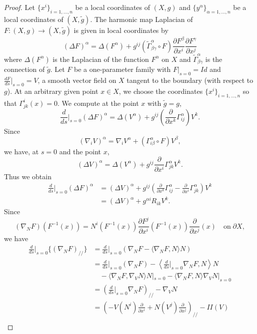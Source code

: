 \begin{proof}
Let $\{x^i\}_{i=1,\ldots,n}$ be a local coordinates of $(X,g)$ and
$\{y^\alpha\}_{\alpha=1,\ldots,n}$ be a local coordinates of
$(X,\tilde{g})$. The harmonic map Laplacian of $F:
(X,g)\rightarrow (X,\tilde{g})$ is given in local coordinates by
$$
(\Delta F)^\alpha
=\Delta(F^\alpha)+g^{ij}(\tilde{\Gamma}^\alpha_{\beta\gamma}\circ
F) \frac{\partial F^\beta}{\partial x^i}\frac{\partial
F^\gamma}{\partial x^j}
$$
where $\Delta(F^\alpha)$ is the Laplacian of the function
$F^\alpha$ on $X$ and $\tilde{\Gamma}^\alpha_{\beta\gamma}$ is the
connection of $\tilde{g}$. Let $F$ be a one-parameter family with
$F|_{s=0}=Id$ and $\frac{dF}{ds}|_{s=0}=V$, a smooth vector field
on $X$ tangent to the boundary (with respect to $g$). At an
arbitrary given point $x\in X$, we choose the coordinates
$\{x^i\}_{i=1,\ldots,n}$ so that $\Gamma^i_{jk}(x)=0.$ We compute
at the point $x$ with $\tilde{g}=g$,
$$
\frac{d}{ds}{\Big|_{s=0}}(\Delta F)^\alpha
=\Delta(V^\alpha)+g^{ij}\left(\frac{\partial}{\partial
x^k}\Gamma^\alpha_{ij}\right)V^k.
$$
Since
$$(\nabla_iV)^{\alpha} =
\nabla_iV^{\alpha} + (\Gamma^{\alpha}_{i\beta}\circ F)V^{\beta},
$$
we have, at $s=0$ and the point $x$,
$$
(\Delta V)^\alpha=\Delta(V^\alpha)+g^{ij}\frac{\partial}{\partial
x^i}\Gamma^\alpha_{jk}V^k.
$$
Thus we obtain
\begin{align}
\frac{d}{ds}{|_{s=0}}(\Delta F)^\alpha&  = (\Delta
V)^\alpha+g^{ij}\left(\frac{\partial}{\partial
x^k}\Gamma^\alpha_{ij}-\frac{\partial}{\partial
x^i}\Gamma^\alpha_{jk}\right)V^k \\
&  = (\Delta V)^\alpha+g^{\alpha i}R_{ik}V^k.\nonumber
\end{align} %
Since
$$
(\nabla_NF)(F^{-1}(x)) =N^i(F^{-1}(x))\frac{\partial F^j}{\partial
x^i}(F^{-1}(x)) \frac{\partial}{\partial x^j}(x)\quad\text{on
}\;\partial X,
$$
we have
\begin{align}
\frac{d}{ds}|_{s=0}\{(\nabla_NF)_{//}\}
&  = \frac{d}{ds}|_{s=0}(\nabla_NF -\langle \nabla_NF,N \rangle N)\\
&  = \frac{d}{ds}|_{s=0}(\nabla_NF)-\left\langle
\frac{d}{ds}|_{s=0}\nabla_NF,N \right\rangle N  \nonumber\\
&\quad - \langle \nabla_NF,\nabla_VN \rangle N |_{s=0} - \langle
\nabla_NF,N
\rangle \nabla_VN |_{s=0} \nonumber\\
&  = \left(\frac{d}{ds}|_{s=0}\nabla_NF\right)_{//} -\nabla_VN \nonumber\\
&  = \left(-V(N^i)\frac{\partial}{\partial
x^i}+N(V^j)\frac{\partial}{\partial x^j}\right)_{//} - II(V) \nonumber\\

\end{align}
\end{proof}

